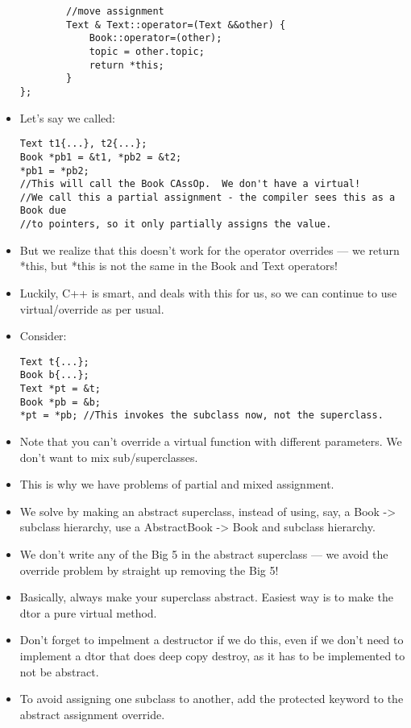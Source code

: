 \documentclass{article}
\begin{document}
\begin{itemize}
\begin{lstlisting}
        //move assignment
        Text & Text::operator=(Text &&other) {
            Book::operator=(other);
            topic = other.topic;
            return *this;
        }
};
\end{lstlisting}
\item Let's say we called:
\begin{lstlisting}
Text t1{...}, t2{...};
Book *pb1 = &t1, *pb2 = &t2;
*pb1 = *pb2;
//This will call the Book CAssOp.  We don't have a virtual!
//We call this a partial assignment - the compiler sees this as a Book due
//to pointers, so it only partially assigns the value.
\end{lstlisting}
\item But we realize that this doesn't work for the operator overrides --- we return *this, but *this is not the same in the Book and Text operators!  
\item Luckily, C++ is smart, and deals with this for us, so we can continue to use virtual/override as per usual.
\item Consider:
\begin{lstlisting}
Text t{...};
Book b{...};
Text *pt = &t;
Book *pb = &b;
*pt = *pb; //This invokes the subclass now, not the superclass.
\end{lstlisting}
\item Note that you can't override a virtual function with different parameters.  We don't want to mix sub/superclasses.
\item This is why we have problems of partial and mixed assignment.
\item We solve by making an abstract superclass, instead of using, say, a Book -> subclass hierarchy, use a AbstractBook -> Book and subclass hierarchy.
\item We don't write any of the Big 5 in the abstract superclass --- we avoid the override problem by straight up removing the Big 5!
\item Basically, always make your superclass abstract.  Easiest way is to make the dtor a pure virtual method.
\item Don't forget to impelment a destructor if we do this, even if we don't need to implement a dtor that does deep copy destroy, as it has to be implemented to not be abstract.
\item To avoid assigning one subclass to another, add the protected keyword to the abstract assignment override.  
\end{itemize}
\end{document}
